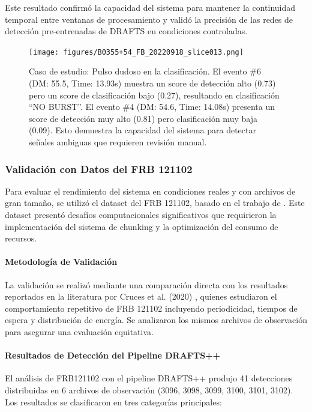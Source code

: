 Este resultado confirmó la capacidad del sistema para mantener la continuidad temporal entre ventanas de procesamiento y validó la precisión de las redes de detección pre-entrenadas de DRAFTS en condiciones controladas.

\begin{figure}[H]
    \centering
    \texttt{[image: figures/B0355+54\_FB\_20220918\_slice013.png]}
    \caption[Pulso dudoso en la clasificación]{Caso de estudio: Pulso dudoso en la clasificación. El evento \#6 (DM: 55.5, Time: 13.93s) muestra un score de detección alto (0.73) pero un score de clasificación bajo (0.27), resultando en clasificación ``NO BURST''. El evento \#4 (DM: 54.6, Time: 14.08s) presenta un score de detección muy alto (0.81) pero clasificación muy baja (0.09). Esto demuestra la capacidad del sistema para detectar señales ambiguas que requieren revisión manual.}
    \label{fig:b0355_slice013}
\end{figure}

\subsubsection{Validación con Datos del FRB 121102}

Para evaluar el rendimiento del sistema en condiciones reales y con archivos de gran tamaño, se utilizó el dataset del FRB 121102, basado en el trabajo de \cite{cruces2020frb121102}. Este dataset presentó desafíos computacionales significativos que requirieron la implementación del sistema de chunking y la optimización del consumo de recursos.

\paragraph{Metodología de Validación}

La validación se realizó mediante una comparación directa con los resultados reportados en la literatura por Cruces et al. (2020) \cite{cruces2020frb121102}, quienes estudiaron el comportamiento repetitivo de FRB 121102 incluyendo periodicidad, tiempos de espera y distribución de energía. Se analizaron los mismos archivos de observación para asegurar una evaluación equitativa.

\paragraph{Resultados de Detección del Pipeline DRAFTS++}

El análisis de FRB121102 con el pipeline DRAFTS++ produjo 41 detecciones distribuidas en 6 archivos de observación (3096, 3098, 3099, 3100, 3101, 3102). Los resultados se clasificaron en tres categorías principales:

